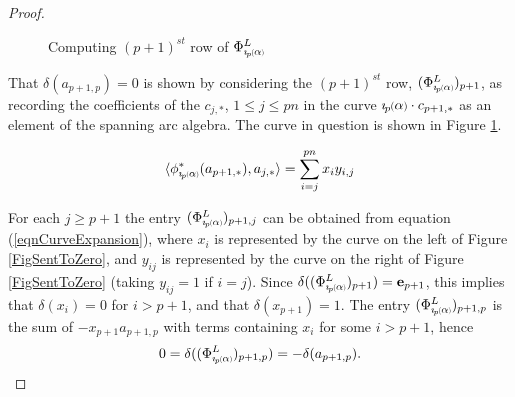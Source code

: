 \documentclass[11pt]{amsart}
\newcommand*{\smallp}[1]{\scalebox{.75}{\ensuremath#1}}
\newcommand*{\subsmallp}[1]{\scalebox{.5}{\ensuremath#1}}
\newcommand{\pp}[2][p]{\imath_{\hspace*{-1pt}#1}\hspace*{-.5pt}\smallp(#2\smallp)}
\newcommand{\subpp}[2][p]{\imath_{\hspace*{-1pt}#1}\hspace*{-.5pt}\subsmallp(#2\subsmallp)}
\theoremstyle{definition}
\begin{document}
\begin{proof}
    \begin{figure}[ht]
      \caption{Computing $(p+1)^{st}$ row of $\Phi_{\subpp\alpha}^L$}
      \label{FigPhiLCalcPhi}
    \end{figure}
That $\delta(a_{p+1,p})=0$ is shown by considering the $(p+1)^{st}$ row, $(\Phi_{\subpp\alpha}^L)_{p+1}$, as recording the coefficients of the $c_{j,\ast}$, $1\le j\le pn$ in the curve $\pp\alpha\cdot c_{p+1,\ast}$ as an element of the spanning arc algebra. The curve in question is shown in Figure \ref{FigPhiLCalcPhi}. 

    \begin{equation}\langle\phi_{\subpp\alpha}^{\ast}(a_{p+1,\ast}), a_{j,\ast}\rangle = \sum_{i=j}^{pn}x_{i}y_{i,j}
      \label{eqnCurveExpansion}
    \end{equation}
    
For each $j\ge p+1$ the entry $(\Phi_{\subpp\alpha}^L)_{p+1,j}$ can be obtained from equation (\ref{eqnCurveExpansion}), where $x_i$ is represented by the curve on the left of Figure \ref{FigSentToZero}, and $y_{ij}$ is represented by the curve on the right of Figure \ref{FigSentToZero} (taking $y_{ij}=1$ if $i=j$). Since $\delta((\Phi_{\subpp\alpha}^L)_{p+1}) = {\bf e}_{p+1}$, this implies that $\delta(x_i)=0$ for $i>p+1$, and that $\delta(x_{p+1}) = 1$. The entry $(\Phi_{\subpp\alpha}^L)_{p+1,p}$ is the sum of $-x_{p+1}a_{p+1,p}$ with terms containing $x_{i}$ for some $i>p+1$, hence 
    \[0 = \delta((\Phi_{\subpp\alpha}^L)_{p+1,p}) = -\delta(a_{p+1,p}).\]


\end{proof}
\end{document}
